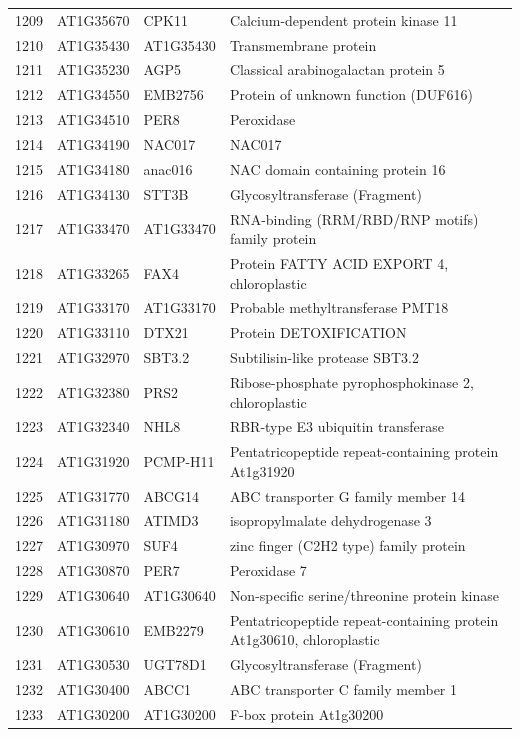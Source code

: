 \documentclass[11pt]{article}
\begin{document}
\begin{center}
\begin{tabular}{rlll}
1209 & AT1G35670 & CPK11 & Calcium-dependent protein kinase 11\\
1210 & AT1G35430 & AT1G35430 & Transmembrane protein\\
1211 & AT1G35230 & AGP5 & Classical arabinogalactan protein 5\\
1212 & AT1G34550 & EMB2756 & Protein of unknown function (DUF616)\\
1213 & AT1G34510 & PER8 & Peroxidase\\
1214 & AT1G34190 & NAC017 & NAC017\\
1215 & AT1G34180 & anac016 & NAC domain containing protein 16\\
1216 & AT1G34130 & STT3B & Glycosyltransferase (Fragment)\\
1217 & AT1G33470 & AT1G33470 & RNA-binding (RRM/RBD/RNP motifs) family protein\\
1218 & AT1G33265 & FAX4 & Protein FATTY ACID EXPORT 4, chloroplastic\\
1219 & AT1G33170 & AT1G33170 & Probable methyltransferase PMT18\\
1220 & AT1G33110 & DTX21 & Protein DETOXIFICATION\\
1221 & AT1G32970 & SBT3.2 & Subtilisin-like protease SBT3.2\\
1222 & AT1G32380 & PRS2 & Ribose-phosphate pyrophosphokinase 2, chloroplastic\\
1223 & AT1G32340 & NHL8 & RBR-type E3 ubiquitin transferase\\
1224 & AT1G31920 & PCMP-H11 & Pentatricopeptide repeat-containing protein At1g31920\\
1225 & AT1G31770 & ABCG14 & ABC transporter G family member 14\\
1226 & AT1G31180 & ATIMD3 & isopropylmalate dehydrogenase 3\\
1227 & AT1G30970 & SUF4 & zinc finger (C2H2 type) family protein\\
1228 & AT1G30870 & PER7 & Peroxidase 7\\
1229 & AT1G30640 & AT1G30640 & Non-specific serine/threonine protein kinase\\
1230 & AT1G30610 & EMB2279 & Pentatricopeptide repeat-containing protein At1g30610, chloroplastic\\
1231 & AT1G30530 & UGT78D1 & Glycosyltransferase (Fragment)\\
1232 & AT1G30400 & ABCC1 & ABC transporter C family member 1\\
1233 & AT1G30200 & AT1G30200 & F-box protein At1g30200\\

\end{tabular}
\end{center}
\end{document}
